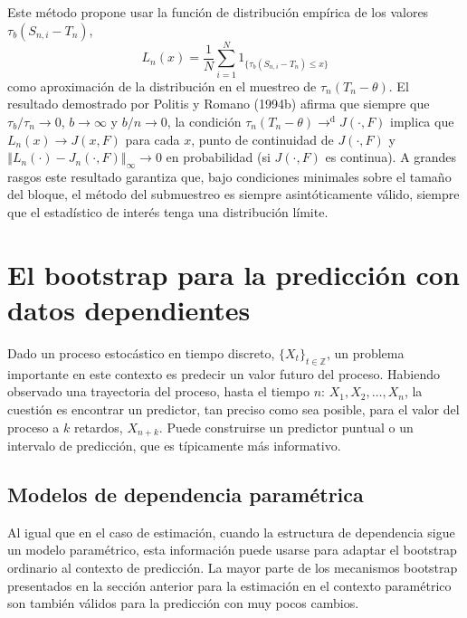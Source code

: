 \documentclass[
]{book}
\theoremstyle{definition}
\theoremstyle{definition}
\theoremstyle{definition}
\theoremstyle{remark}
\begin{document}
Este método propone usar la función de distribución empírica de los
valores \(\tau _{b}(S_{n,i}-T_n)\),
\[L_n(x)=\frac{1}{N}\sum_{i=1}^{N}1_{\{\tau _{b}(S_{n,i}-T_n)\leq x\}}\]como
aproximación de la distribución en el muestreo de \(\tau _n(T_n-\theta )\). El resultado demostrado por Politis y Romano
(1994b) afirma que siempre que \(\tau _{b}/\tau _n\rightarrow 0\),
\(b\rightarrow \infty\) y \(b/n\rightarrow 0\), la condición \(\tau _n(T_n-\theta ){ \rightarrow }^{\mathrm{d}}J(\cdot ,F)\) implica que \(L_n(x)\rightarrow J(x,F)\) para cada \(x\), punto de continuidad de \(J(\cdot ,F)\) y
\(\left\Vert L_n(\cdot )-J_n(\cdot ,F)\right\Vert _{\infty }\rightarrow 0\) en
probabilidad (si \(J(\cdot ,F)\) es continua). A grandes rasgos este
resultado garantiza que, bajo condiciones minimales sobre el tamaño del
bloque, el método del submuestreo es siempre asintóticamente válido,
siempre que el estadístico de interés tenga una distribución límite.

\hypertarget{el-bootstrap-para-la-predicciuxf3n-con-datos-dependientes}{%
\section{El bootstrap para la predicción con datos dependientes}\label{el-bootstrap-para-la-predicciuxf3n-con-datos-dependientes}}

Dado un proceso estocástico en tiempo discreto,
\(\{X_{t}\}_{t\in \mathbb{ Z}}\), un problema importante en este contexto es predecir un valor
futuro del proceso. Habiendo observado una trayectoria del proceso,
hasta el tiempo \(n\): \(X_1,X_2,\ldots ,X_n\), la cuestión es
encontrar un predictor, tan preciso como sea posible, para el valor del
proceso a \(k\) retardos,
\(X_{n+k}\). Puede construirse un predictor puntual o un intervalo de
predicción, que es típicamente más informativo.

\hypertarget{modelos-de-dependencia-paramuxe9trica}{%
\subsection{Modelos de dependencia paramétrica}\label{modelos-de-dependencia-paramuxe9trica}}

Al igual que en el caso de estimación, cuando la estructura de
dependencia sigue un modelo paramétrico, esta información puede usarse
para adaptar el bootstrap ordinario al contexto de predicción. La mayor
parte de los mecanismos bootstrap presentados en la sección anterior
para la estimación en el contexto paramétrico son también válidos para
la predicción con muy pocos cambios.
\end{document}
